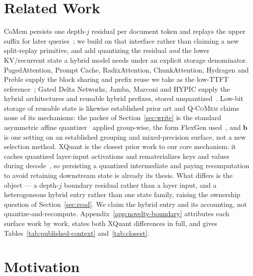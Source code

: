 \documentclass{article}
\newcommand{\qcomem}{\textsc{Q-CoMem}}
\begin{document}
\section{Related Work}
\label{sec:related}

CoMem persists one depth-$j$ residual per document token and replays the upper
suffix for later queries~\citep{liu2026comem,liu2026understanding}; we build on
that interface rather than claiming a new split-replay primitive, and add
quantizing the residual \emph{and} the lower KV/recurrent state a hybrid model
needs under an explicit storage denominator.  PagedAttention, Prompt Cache,
RadixAttention, ChunkAttention, Hydragen and Preble supply the block sharing and
prefix reuse we take as the low-TTFT
reference~\citep{kwon2023pagedattention,gim2024promptcache,zheng2024sglang,
ye2024chunkattention,juravsky2024hydragen,srivatsa2025preble}; Gated Delta
Networks, Jamba, Marconi and HYPIC supply the hybrid architectures and reusable
hybrid prefixes, stored
unquantized~\citep{yang2025gateddeltanet,lieber2025jamba,pan2025marconi,liu2026hypic}.
Low-bit storage of reusable state is likewise
established prior art and \qcomem{} claims none of its mechanisms: the packer of
Section~\ref{sec:write} is the standard asymmetric affine
quantizer~\citep{jacob2018quantization} applied group-wise, the form FlexGen
used~\citep{sheng2023flexgen}, and $\mathbf b$ is one setting on an established
grouping and mixed-precision surface, not a new selection method.
XQuant is the closest prior work to our core mechanism: it caches quantized
layer-input activations and rematerializes keys and values during
decode~\citep{tomar2025xquant}, so persisting a quantized intermediate and paying
recomputation to avoid retaining downstream state is already its thesis.  What
differs is the object --- a depth-$j$ boundary residual rather than a layer
input, and a heterogeneous hybrid entry rather than one state family, raising the
ownership question of Section~\ref{sec:read}.  We claim the hybrid entry and its
accounting, not quantize-and-recompute.
Appendix~\ref{app:novelty-boundary} attributes each surface work by work, states
both XQuant differences in full, and gives
Tables~\ref{tab:published-context} and~\ref{tab:closest}.

\section{Motivation}
\label{sec:motivation}
\end{document}
